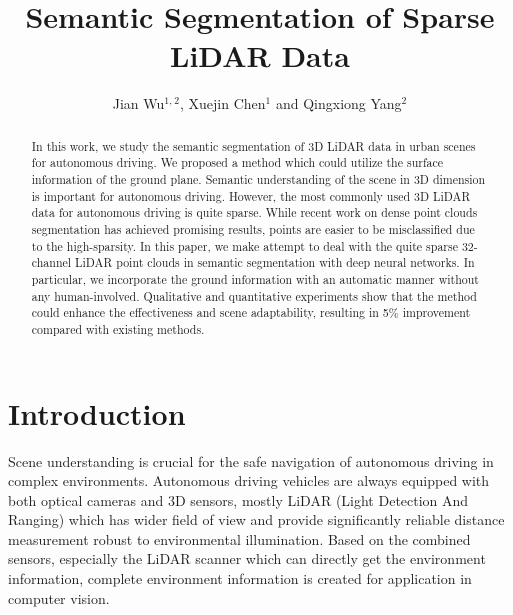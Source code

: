 \documentclass{sip}%
\begin{document}
\title[Semantic Segmentation of Sparse LiDAR Data]{Semantic Segmentation of Sparse LiDAR Data}

\author[
]{Jian Wu$^{1,}$$^{2}$, Xuejin Chen$^{1}$ and Qingxiong Yang$^{2}$}

\address{
}


\begin{abstract}
In this work, we study the semantic segmentation of 3D LiDAR data in urban scenes for autonomous driving.
We proposed a method which could utilize the surface information of the ground plane.
Semantic understanding of the scene in 3D dimension is important for autonomous driving. However, the most commonly used 3D LiDAR data for autonomous driving is quite sparse. While recent work on dense point clouds segmentation has achieved promising results, points are easier to be misclassified due to the high-sparsity. In this paper, we make attempt to deal with the quite sparse 32-channel LiDAR point clouds in semantic segmentation with deep neural networks.
In particular, we incorporate the ground information with an automatic manner without any human-involved. Qualitative and quantitative experiments show that the method could
enhance the effectiveness and scene adaptability, resulting in 5\% improvement compared with existing methods.
\end{abstract}


\maketitle

\section{Introduction}
Scene understanding is crucial for the safe navigation of autonomous driving in complex environments.
Autonomous driving vehicles are always
equipped with both optical cameras and 3D sensors, mostly LiDAR (Light Detection And Ranging) which has wider field of view and provide significantly reliable distance
measurement robust to environmental illumination.
Based on the combined sensors, especially the LiDAR scanner which can directly get the environment information, complete environment information is created for application in computer vision.
\end{document}
